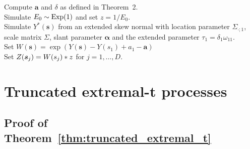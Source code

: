 \documentclass[12pt]{article}
\begin{document}
\begin{algorithm}
\caption{Exact simulation from the skewed Brown-Resnick process at location $\bs_i,i=1,\dots,D$.}
\label{algo:log_skew_normal}
Compute $\bm a$ and $\delta$ as defined in Theorem~2.\\
Simulate $E_0 \sim \rm{Exp}(1)$ and set $z=1/E_0$.\\ 
Simulate $Y^*(\bm s)$ from an extended skew normal with location parameter $\Sigma_{\cdot;1}$, scale matrix $\Sigma$, slant parameter $\bm \alpha$ and the extended parameter $\tau_1=\delta_1 \omega_{11}$.\\
Set $W(\bm s) = \exp(Y(\bm s)-Y(s_1)+a_1 - \bm a)$ \\
Set $Z({\boldsymbol{s}}_j)=W(s_j)*z$ for $j=1,\dots,D$. \\
\end{algorithm}



\section{Truncated extremal-t processes}
\label{sec:appendix_truncated_extremal_t}

\subsection{Proof of Theorem~\ref{thm:truncated_extremal_t}}
\end{document}
